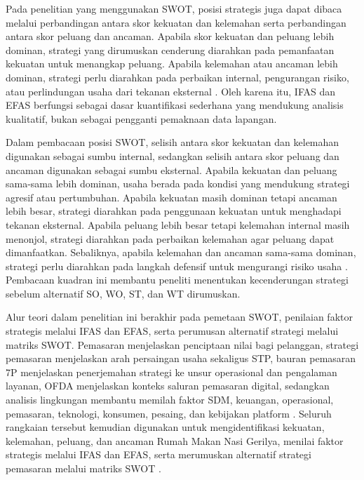 Pada penelitian yang menggunakan SWOT, posisi strategis juga dapat dibaca melalui perbandingan antara skor kekuatan dan kelemahan serta perbandingan antara skor peluang dan ancaman. Apabila skor kekuatan dan peluang lebih dominan, strategi yang dirumuskan cenderung diarahkan pada pemanfaatan kekuatan untuk menangkap peluang. Apabila kelemahan atau ancaman lebih dominan, strategi perlu diarahkan pada perbaikan internal, pengurangan risiko, atau perlindungan usaha dari tekanan eksternal \parencite{rangkuti2016analisisSWOT,syafaat2020sepatu}. Oleh karena itu, IFAS dan EFAS berfungsi sebagai dasar kuantifikasi sederhana yang mendukung analisis kualitatif, bukan sebagai pengganti pemaknaan data lapangan.

Dalam pembacaan posisi SWOT, selisih antara skor kekuatan dan kelemahan digunakan sebagai sumbu internal, sedangkan selisih antara skor peluang dan ancaman digunakan sebagai sumbu eksternal. Apabila kekuatan dan peluang sama-sama lebih dominan, usaha berada pada kondisi yang mendukung strategi agresif atau pertumbuhan. Apabila kekuatan masih dominan tetapi ancaman lebih besar, strategi diarahkan pada penggunaan kekuatan untuk menghadapi tekanan eksternal. Apabila peluang lebih besar tetapi kelemahan internal masih menonjol, strategi diarahkan pada perbaikan kelemahan agar peluang dapat dimanfaatkan. Sebaliknya, apabila kelemahan dan ancaman sama-sama dominan, strategi perlu diarahkan pada langkah defensif untuk mengurangi risiko usaha \parencite{rangkuti2016analisisSWOT,david2023strategicmanagement}. Pembacaan kuadran ini membantu peneliti menentukan kecenderungan strategi sebelum alternatif SO, WO, ST, dan WT dirumuskan.

Alur teori dalam penelitian ini berakhir pada pemetaan SWOT, penilaian faktor strategis melalui IFAS dan EFAS, serta perumusan alternatif strategi melalui matriks SWOT. Pemasaran menjelaskan penciptaan nilai bagi pelanggan, strategi pemasaran menjelaskan arah persaingan usaha sekaligus STP, bauran pemasaran 7P menjelaskan penerjemahan strategi ke unsur operasional dan pengalaman layanan, OFDA menjelaskan konteks saluran pemasaran digital, sedangkan analisis lingkungan membantu memilah faktor SDM, keuangan, operasional, pemasaran, teknologi, konsumen, pesaing, dan kebijakan platform \parencite{kotler2023principlesmarketing,chaffey2022digitalmarketing,david2023strategicmanagement}. Seluruh rangkaian tersebut kemudian digunakan untuk mengidentifikasi kekuatan, kelemahan, peluang, dan ancaman Rumah Makan Nasi Gerilya, menilai faktor strategis melalui IFAS dan EFAS, serta merumuskan alternatif strategi pemasaran melalui matriks SWOT \parencite{helms2010swotreview,gurel2017swot,haliza2023seqapla}.

